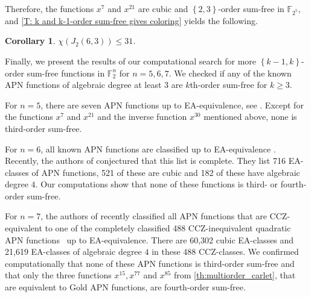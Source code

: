 \documentclass[12pt]{article}
\newtheorem{cor}[thm]{Corollary}
\theoremstyle{definition}
\newcommand{\F}{\mathbb F}
\newcommand{\Fpnv}{\mathbb{F}_2^n}
\newcommand{\set}[1]{\left\{#1\right\}}
\begin{document}
Therefore, the functions $x^7$ and $x^{21}$ are cubic and $\set{2,3}$-order sum-free in $\F_{2^5}$, and \cref{T: k and k-1-order sum-free gives coloring} yields the following.

\begin{cor}
    $ \chi(J_2(6,3))\leq 31$.
\end{cor}

Finally, we present the results of our computational search for more $\set{k-1,k}$-order sum-free functions in $\Fpnv$ for $n=5,6,7$. We checked if any of the known APN functions of algebraic degree at least $3$ are $k$th-order sum-free for $k \ge 3$. \par

For $n=5$, there are seven APN functions up to EA-equivalence, see \cite{brinkmannleander2008}. 
Except for the functions $x^7$ and $x^{21}$ and the inverse function $x^{30}$ mentioned above, none is third-order sum-free.\par

For $n=6$, all known APN functions are classified up to EA-equivalence \cite{calderini2020,langevin2012}. Recently, the authors of \cite{baudrin2025} conjectured that this list is complete. They list 716 EA-classes of APN functions, 521 of these are cubic and 182 of these have algebraic degree $4$. Our computations show that none of these functions is third- or fourth-order sum-free.\par

For $n=7$, the authors of \cite{baudrin2025} recently classified all APN functions that are CCZ-equivalent to one of the completely classified 488 CCZ-inequivalent quadratic APN functions~\cite{calderini2020} up to EA-equivalence. There are 60,302 cubic EA-classes and 21,619 EA-classes of algebraic degree $4$ in these 488 CCZ-classes. We confirmed computationally that none of these APN functions is third-order sum-free and that only the three functions $x^{15}, x^{77}$ and $x^{85}$ from \cref{th:multiorder_carlet}, that are equivalent to Gold APN functions, are fourth-order sum-free.
\end{document}
